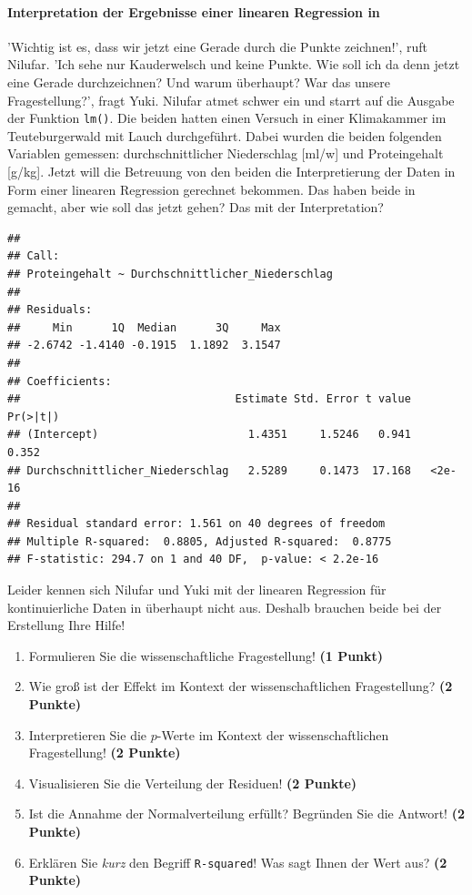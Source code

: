 \documentclass[a4paper, 9pt]{scrartcl}\usepackage[]{graphicx}\usepackage[]{xcolor}
\makeatletter
\newenvironment{kframe}{%
 \def\at@end@of@kframe{}%
 \ifinner\ifhmode%
  \def\at@end@of@kframe{\end{minipage}}%
  \begin{minipage}{\columnwidth}%
 \fi\fi%
 \def\FrameCommand##1{\hskip\@totalleftmargin \hskip-\fboxsep
 \colorbox{shadecolor}{##1}\hskip-\fboxsep
     \hskip-\linewidth \hskip-\@totalleftmargin \hskip\columnwidth}%
 \MakeFramed {\advance\hsize-\width
   \@totalleftmargin\z@ \linewidth\hsize
   \@setminipage}}%
 {\par\unskip\endMakeFramed%
 \at@end@of@kframe}
\newenvironment{knitrout}{}{} %
\makeatother
\begin{document}
\ifcollection
\paragraph{Interpretation der Ergebnisse einer linearen Regression in \Rlogo}
\fi

'Wichtig ist es, dass wir jetzt eine Gerade durch die Punkte zeichnen!', ruft Nilufar. 'Ich sehe nur Kauderwelsch und keine Punkte. Wie soll ich da denn jetzt eine Gerade durchzeichnen? Und warum überhaupt? War das unsere Fragestellung?', fragt Yuki. Nilufar atmet schwer ein und starrt auf die \Rlogo Ausgabe der Funktion \texttt{lm()}. Die beiden hatten einen Versuch in einer Klimakammer im Teuteburgerwald mit Lauch durchgeführt. Dabei wurden die beiden folgenden Variablen gemessen: durchschnittlicher Niederschlag [ml/w] und Proteingehalt [g/kg]. Jetzt will die Betreuung von den beiden die Interpretierung der Daten in Form einer linearen Regression gerechnet bekommen. Das haben beide in \Rlogo gemacht, aber wie soll das jetzt gehen? Das mit der Interpretation?

\begin{knitrout}
\color{fgcolor}\begin{kframe}
\begin{verbatim}
## 
## Call:
## Proteingehalt ~ Durchschnittlicher_Niederschlag
## 
## Residuals:
##     Min      1Q  Median      3Q     Max 
## -2.6742 -1.4140 -0.1915  1.1892  3.1547 
## 
## Coefficients:
##                                 Estimate Std. Error t value Pr(>|t|)
## (Intercept)                       1.4351     1.5246   0.941    0.352
## Durchschnittlicher_Niederschlag   2.5289     0.1473  17.168   <2e-16
## 
## Residual standard error: 1.561 on 40 degrees of freedom
## Multiple R-squared:  0.8805,	Adjusted R-squared:  0.8775 
## F-statistic: 294.7 on 1 and 40 DF,  p-value: < 2.2e-16
\end{verbatim}
\end{kframe}
\end{knitrout}

Leider kennen sich Nilufar und Yuki mit der linearen Regression für kontinuierliche Daten in \Rlogo überhaupt nicht aus. Deshalb brauchen beide bei der Erstellung Ihre Hilfe!


\begin{enumerate}
\item Formulieren Sie die wissenschaftliche Fragestellung! \textbf{(1 Punkt)}
\item Wie groß ist der Effekt im Kontext der wissenschaftlichen Fragestellung? \textbf{(2 Punkte)} 
\item Interpretieren Sie die $p$-Werte im Kontext der wissenschaftlichen Fragestellung! \textbf{(2 Punkte)}
\item Visualisieren Sie die Verteilung der Residuen! \textbf{(2 Punkte)} 
\item Ist die Annahme der Normalverteilung erfüllt? Begründen Sie die Antwort! \textbf{(2 Punkte)}
\item Erklären Sie \textit{kurz} den Begriff \texttt{R-squared}! Was sagt Ihnen der Wert aus? \textbf{(2 Punkte)}
\end{enumerate}
 
\end{document}
